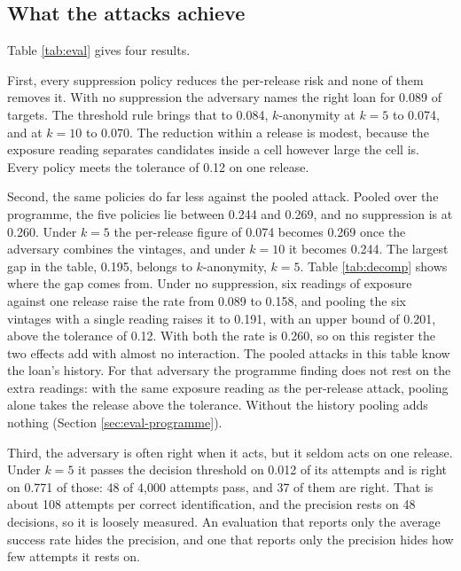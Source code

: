 \documentclass[11pt,a4paper]{article}
\theoremstyle{plain}
\theoremstyle{definition}
\theoremstyle{definition}
\theoremstyle{plain}
\begin{document}
\subsection{What the attacks achieve}\label{sec:eval-results}

Table \ref{tab:eval} gives four results.

First, every suppression policy reduces the per-release risk and none of them
removes it. With no suppression the adversary names the right loan for
0.089 of targets. The threshold rule brings that to
0.084, $k$-anonymity at $k=5$ to 0.074, and at $k=10$ to
0.070. The reduction within a release is modest, because the exposure reading
separates candidates inside a cell however large the cell is. Every policy meets
the tolerance of 0.12 on one release.

Second, the same policies do far less against the pooled attack. Pooled over the
programme, the five policies lie between 0.244 and 0.269, and no suppression is
at 0.260. Under $k=5$ the per-release figure of 0.074 becomes 0.269 once the
adversary combines the vintages, and under $k=10$ it becomes 0.244. The largest
gap in the table, 0.195, belongs to $k$-anonymity, $k=5$. Table \ref{tab:decomp}
shows where the gap comes from. Under no suppression, six readings of exposure
against one release raise the rate from 0.089 to 0.158, and pooling the six
vintages with a single reading raises it to 0.191, with an upper bound of 0.201,
above the tolerance of 0.12. With both the rate is 0.260, so on this register the
two effects add with almost no interaction. The pooled attacks in this table know
the loan's history. For that adversary the programme finding does not rest on
the extra readings: with the same exposure reading as the per-release attack,
pooling alone takes the release above the tolerance. Without the history pooling
adds nothing (Section \ref{sec:eval-programme}).

\begingroup\let\small\scriptsize\setlength{\tabcolsep}{2pt}\endgroup

Third, the adversary is often right when it acts, but it seldom acts on one
release. Under $k=5$ it passes the decision threshold on 0.012 of its attempts
and is right on 0.771 of those: 48 of 4{,}000 attempts pass, and 37 of them are
right. That is about 108 attempts per correct identification, and the precision
rests on 48 decisions, so it is loosely measured. An evaluation that reports only
the average success rate hides the precision, and one that reports only the
precision hides how few attempts it rests on.
\end{document}
